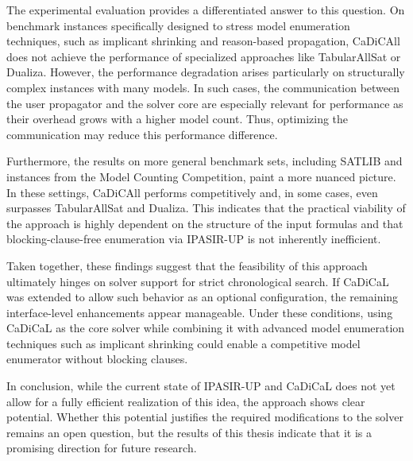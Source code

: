 \documentclass[12pt,a4paper]{article}
\begin{document}
The experimental evaluation provides a differentiated answer to this question. On benchmark instances specifically designed to stress model enumeration techniques, such as implicant shrinking and reason-based propagation, CaDiCAll does not achieve the performance of specialized approaches like TabularAllSat or Dualiza. However, the performance degradation arises particularly on structurally complex instances with many models. In such cases, the communication between the user propagator and the solver core are especially relevant for performance as their overhead grows with a higher model count. Thus, optimizing the communication may reduce this performance difference.

Furthermore, the results on more general benchmark sets, including SATLIB and instances from the Model Counting Competition, paint a more nuanced picture. In these settings, CaDiCAll performs competitively and, in some cases, even surpasses TabularAllSat and Dualiza. This indicates that the practical viability of the approach is highly dependent on the structure of the input formulas and that blocking-clause-free enumeration via IPASIR-UP is not inherently inefficient.

Taken together, these findings suggest that the feasibility of this approach ultimately hinges on solver support for strict chronological search. If CaDiCaL was extended to allow such behavior as an optional configuration, the remaining interface-level enhancements appear manageable. Under these conditions, using CaDiCaL as the core solver while combining it with advanced model enumeration techniques such as implicant shrinking could enable a competitive model enumerator without blocking clauses.

In conclusion, while the current state of IPASIR-UP and CaDiCaL does not yet allow for a fully efficient realization of this idea, the approach shows clear potential. Whether this potential justifies the required modifications to the solver remains an open question, but the results of this thesis indicate that it is a promising direction for future research.

\newpage


\end{document}
